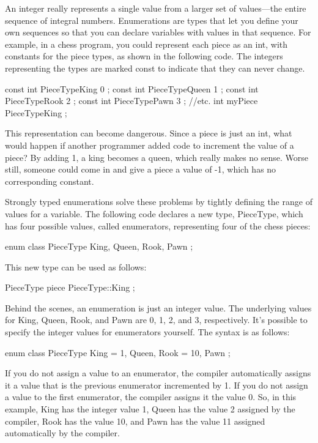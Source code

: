 An integer really represents a single value from a larger set of values—the entire sequence of integral numbers. Enumerations are types that let you define your own sequences so that you can declare variables with values in that sequence. For example, in a chess program, you could represent each piece as an int, with constants for the piece types, as shown in the following code. The integers representing the types are marked const to indicate that they can never change.

\begin{cpp}
const int PieceTypeKing { 0 };
const int PieceTypeQueen { 1 };
const int PieceTypeRook { 2 };
const int PieceTypePawn { 3 };
//etc.
int myPiece { PieceTypeKing };
\end{cpp}

This representation can become dangerous. Since a piece is just an int, what would happen if another programmer added code to increment the value of a piece? By adding 1, a king becomes a queen, which really makes no sense. Worse still, someone could come in and give a piece a value of -1, which has no corresponding constant.

Strongly typed enumerations solve these problems by tightly defining the range of values for a variable. The following code declares a new type, PieceType, which has four possible values, called enumerators, representing four of the chess pieces:

\begin{cpp}
enum class PieceType { King, Queen, Rook, Pawn };
\end{cpp}

This new type can be used as follows:

\begin{cpp}
PieceType piece { PieceType::King };
\end{cpp}

Behind the scenes, an enumeration is just an integer value. The underlying values for King, Queen, Rook, and Pawn are 0, 1, 2, and 3, respectively. It’s possible to specify the integer values for enumerators yourself. The syntax is as follows:

\begin{cpp}
enum class PieceType
{
    King = 1,
    Queen,
    Rook = 10,
    Pawn
};
\end{cpp}

If you do not assign a value to an enumerator, the compiler automatically assigns it a value that is the previous enumerator incremented by 1. If you do not assign a value to the first enumerator, the compiler assigns it the value 0. So, in this example, King has the integer value 1, Queen has the value 2 assigned by the compiler, Rook has the value 10, and Pawn has the value 11 assigned automatically by the compiler.

